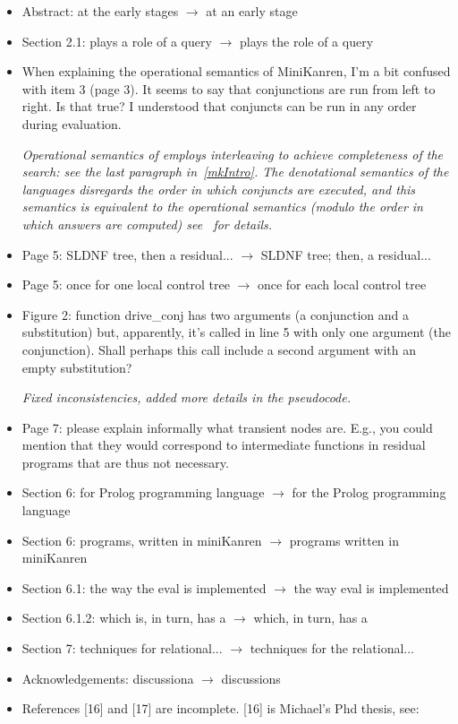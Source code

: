 \begin{itemize}
  \item Abstract: at the early stages $\rightarrow$ at an early stage
  \item Section 2.1: plays a role of a query $\rightarrow$ plays the role of a query
  \item When explaining the operational semantics of MiniKanren, I'm a bit
  confused with item 3 (page 3). It seems to say that conjunctions are
  run from left to right. Is that true? I understood that conjuncts
  can be run in any order during evaluation.

  \emph{Operational semantics of \mk employs interleaving to achieve completeness of the search: see the last paragraph in~\ref{mkIntro}.
  The denotational semantics of the languages disregards the order in which conjuncts are executed, and this semantics is equivalent to the operational semantics (modulo the order in which answers are computed) see~\cite{rozplokhas2020certified} for details.}
  \item Page 5: SLDNF tree, then a residual... $\rightarrow$ SLDNF tree; then, a residual...
  \item Page 5: once for one local control tree $\rightarrow$ once for each local control tree
  \item Figure 2: function drive_conj has two arguments (a conjunction
  and a substitution) but, apparently, it's called in line 5 with only
  one argument (the conjunction). Shall perhaps this call include a second
  argument with an empty substitution?

  \emph{Fixed inconsistencies, added more details in the pseudocode.}
  \item Page 7: please explain informally what transient nodes are. E.g., you
  could mention that they would correspond to intermediate functions in
  residual programs that are thus not necessary.
  \item Section 6: for Prolog programming language $\rightarrow$ for the Prolog
  programming language
  \item Section 6: programs, written in miniKanren $\rightarrow$ programs written in miniKanren
  \item Section 6.1: the way the eval is implemented $\rightarrow$ the way eval is implemented
  \item Section 6.1.2: which is, in turn, has a $\rightarrow$ which, in turn, has a
  \item Section 7: techniques for relational... $\rightarrow$ techniques for the relational...
  \item Acknowledgements: discussiona $\rightarrow$ discussions
  \item References [16] and [17] are incomplete. [16] is Michael's Phd thesis, see:


\end{itemize}
